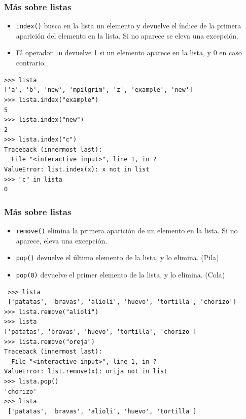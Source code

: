 \documentclass{beamer}
\begin{document}
\begin{frame}[fragile]
\frametitle{Más sobre listas}

\begin{itemize}
\item \verb|index()| busca en la lista un elemento y devuelve el
  índice de la primera aparición del elemento en la lista. Si no
  aparece se eleva una excepción.
\item El operador \verb|in| devuelve 1 si un elemento aparece en la
  lista, y 0 en caso contrario.
\end{itemize}

\begin{footnotesize}
\begin{verbatim}
>>> lista
['a', 'b', 'new', 'mpilgrim', 'z', 'example', 'new']
>>> lista.index("example") 
5
>>> lista.index("new")     
2
>>> lista.index("c")       
Traceback (innermost last):
  File "<interactive input>", line 1, in ?
ValueError: list.index(x): x not in list
>>> "c" in lista           
0
\end{verbatim}
\end{footnotesize}

\end{frame}




\begin{frame}[fragile]
\frametitle{Más sobre listas}

\begin{itemize}
\item \verb|remove()| elimina la primera aparición de un elemento en
  la lista. Si no aparece, eleva una excepción.
\item \verb|pop()| devuelve el último elemento de la lista, y lo elimina. (Pila) 
\item \verb|pop(0)| devuelve el primer elemento de la lista, y lo elimina. (Cola)
\end{itemize}

\begin{footnotesize}
\begin{verbatim}
 >>> lista
 ['patatas', 'bravas', 'alioli', 'huevo', 'tortilla', 'chorizo']
>>> lista.remove("alioli") 
>>> lista
['patatas', 'bravas', 'huevo', 'tortilla', 'chorizo']
>>> lista.remove("oreja")   
Traceback (innermost last):
  File "<interactive input>", line 1, in ?
ValueError: list.remove(x): orija not in list
>>> lista.pop()         
'chorizo'
>>> lista
 ['patatas', 'bravas', 'alioli', 'huevo', 'tortilla']
\end{verbatim}
\end{footnotesize}

\end{frame}
\end{document}
